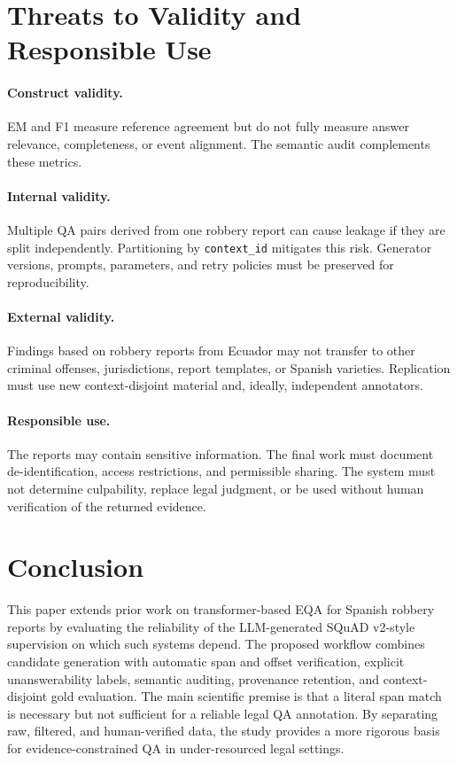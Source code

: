 \documentclass[graybox]{SNmult}
\begin{document}
\section{Threats to Validity and Responsible Use}
\label{sec:validity}

\paragraph{Construct validity.} EM and F1 measure reference agreement but do not fully measure answer relevance, completeness, or event alignment. The semantic audit complements these metrics.

\paragraph{Internal validity.} Multiple QA pairs derived from one robbery report can cause leakage if they are split independently. Partitioning by \texttt{context\_id} mitigates this risk. Generator versions, prompts, parameters, and retry policies must be preserved for reproducibility.

\paragraph{External validity.} Findings based on robbery reports from Ecuador may not transfer to other criminal offenses, jurisdictions, report templates, or Spanish varieties. Replication must use new context-disjoint material and, ideally, independent annotators.

\paragraph{Responsible use.} The reports may contain sensitive information. The final work must document de-identification, access restrictions, and permissible sharing. The system must not determine culpability, replace legal judgment, or be used without human verification of the returned evidence.

\section{Conclusion}
\label{sec:conclusion}

This paper extends prior work on transformer-based EQA for Spanish robbery reports by evaluating the reliability of the LLM-generated SQuAD v2-style supervision on which such systems depend. The proposed workflow combines candidate generation with automatic span and offset verification, explicit unanswerability labels, semantic auditing, provenance retention, and context-disjoint gold evaluation. The main scientific premise is that a literal span match is necessary but not sufficient for a reliable legal QA annotation. By separating raw, filtered, and human-verified data, the study provides a more rigorous basis for evidence-constrained QA in under-resourced legal settings.
\end{document}
